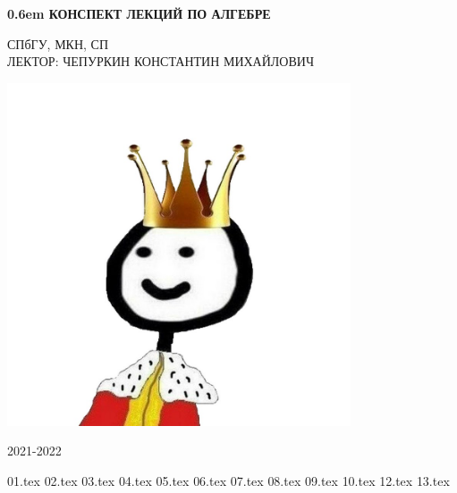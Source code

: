 \documentclass[12pt,letterpaper]{report}
\begin{document}
\clearpage
\newcommand\nbvspace[1][3]{\vspace*{\stretch{#1}}}
\newcommand\nbstretchyspace{\spaceskip0.5em plus 0.25em minus 0.25em}
\newcommand{\nbtitlestretch}{\spaceskip0.6em}
\pagestyle{empty}
\begin{center}
\bfseries
\nbvspace[1]
\Huge
{\nbtitlestretch\huge
КОНСПЕКТ ЛЕКЦИЙ ПО АЛГЕБРЕ}

\nbvspace[1]
\normalsize

СПбГУ, МКН, СП\\
ЛЕКТОР: ЧЕПУРКИН КОНСТАНТИН МИХАЙЛОВИЧ
\nbvspace[1]
\\

\nbvspace[2]

\includegraphics[width=4.0in]{./images/logo.jpeg}
\nbvspace[3]
\normalsize

\large
2021-2022
\nbvspace[1]
\end{center}
\newpage
\pagestyle{plain}
\fi
\tableofcontents
\newpage
\begin{normalsize}

{01.tex}
\pagebreak
{02.tex}
\pagebreak
{03.tex}
\pagebreak
{04.tex}
\pagebreak
{05.tex}
\pagebreak
{06.tex}
\pagebreak
{07.tex}
\pagebreak
{08.tex}
\pagebreak
{09.tex}
\pagebreak
{10.tex}
\pagebreak
{12.tex}
\pagebreak
{13.tex}
\end{normalsize}
\end{document}
